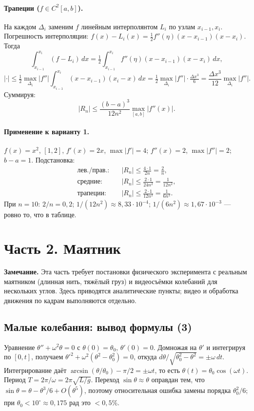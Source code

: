 \documentclass[12pt,a4paper]{article}
\begin{document}
\paragraph{Трапеции ($f\in C^2[a,b]$).} На каждом $\Delta_i$ заменим $f$
линейным интерполянтом $L_i$ по узлам $x_{i-1},x_i$. Погрешность
интерполяции:
$f(x)-L_i(x)=\tfrac{1}{2}f''(\eta)(x-x_{i-1})(x-x_i)$. Тогда
\[
  \int_{x_{i-1}}^{x_i}\!(f-L_i)\,dx
  = \tfrac{1}{2}\!\int_{x_{i-1}}^{x_i}\!f''(\eta)(x-x_{i-1})(x-x_i)\,dx,
\]
\[
  \left|\cdot\right|
  \le \tfrac{1}{2}\max_{\Delta_i}|f''|\!\int_{x_{i-1}}^{x_i}\!(x-x_{i-1})(x_i-x)\,dx
  = \tfrac{1}{2}\max_{\Delta_i}|f''|\cdot \tfrac{\Delta x^3}{6}
  = \frac{\Delta x^3}{12}\max_{\Delta_i}|f''|.
\]
Суммируя:
\[
  |R_n|\le \frac{(b-a)^3}{12n^2}\max_{[a,b]}|f''(x)|.
\]

\paragraph{Применение к варианту 1.} $f(x)=x^2$, $[1,2]$,
$f'(x)=2x$, $\max|f'|=4$; $f''(x)=2$, $\max|f''|=2$; $b-a=1$. Подстановка:
\begin{align*}
\text{лев./прав.:}\quad & |R_n|\le \frac{4\cdot 1}{2n}=\frac{2}{n},\\
\text{средние:}\quad    & |R_n|\le \frac{2\cdot 1}{24n^2}=\frac{1}{12n^2},\\
\text{трапеции:}\quad   & |R_n|\le \frac{2\cdot 1}{12n^2}=\frac{1}{6n^2}.
\end{align*}
При $n=10$: $2/n=0{,}2$; $1/(12n^2)\approx 8{,}33\!\cdot\!10^{-4}$;
$1/(6n^2)\approx 1{,}67\!\cdot\!10^{-3}$ --- ровно то, что в таблице.

\section*{Часть 2. Маятник}

\textbf{Замечание.} Эта часть требует постановки физического эксперимента
с реальным маятником (длинная нить, тяжёлый груз) и видеосъёмки
колебаний для нескольких углов. Здесь приводятся аналитические пункты;
видео и обработка движения по кадрам выполняются отдельно.

\subsection*{Малые колебания: вывод формулы (3)}

Уравнение $\theta''+\omega^2\theta=0$ с $\theta(0)=\theta_0$,
$\theta'(0)=0$. Домножая на $\theta'$ и интегрируя по $[0,t]$, получаем
$\theta'^2+\omega^2(\theta^2-\theta_0^2)=0$, откуда
$d\theta/\sqrt{\theta_0^2-\theta^2}=\pm\omega\,dt$. Интегрирование даёт
$\arcsin(\theta/\theta_0)-\pi/2=\pm\omega t$, то есть
$\theta(t)=\theta_0\cos(\omega t)$. Период $T=2\pi/\omega=2\pi\sqrt{L/g}$.
Переход $\sin\theta\approx\theta$ оправдан тем, что
$\sin\theta=\theta-\theta^3/6+O(\theta^5)$, поэтому относительная ошибка
замены порядка $\theta_0^2/6$; при $\theta_0<10^\circ\approx0{,}175$
рад это $<0{,}5\%$.
\end{document}
